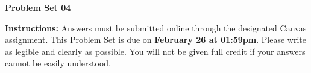 \documentclass[12pt]{exam}
\newcommand{\examdate}{\fontfamily{lmss}\selectfont \textbf{February 26 at 01:59pm}} %
\begin{document}
\selectfont

\begin{center}
    \textbf{{\LARGE Problem Set 04}} \\
    \bigskip 
\end{center}

\noindent \textbf{Instructions:} 
Answers must be submitted online through the designated Canvas assignment. 
This Problem Set is due on \examdate.
Please write as legible and clearly as possible. 
You will not be given full credit if your answers cannot be easily understood. 


\end{document}
